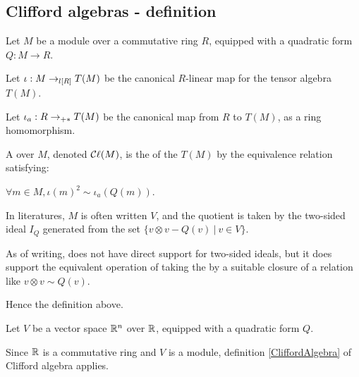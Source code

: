 \subsection{Clifford algebras - definition}
\label{sec:def}

\begin{definition}
    \label{CliffordAlgebra}
    \leanok

    Let $M$ be a module over a commutative ring $R$, equipped with a quadratic form $Q: M \to R$.

    Let $\iota : M \lmap{R} T(M)$ be the canonical $R$-linear map for the tensor algebra $T(M)$.

    Let $\iota_a : R \amap{R} T(M)$ be the canonical map from $R$ to $T(M)$, as a ring homomorphism.

    A  over $M$, denoted $\Cl (M)$, is
    the  of the  $T(M)$
    by the equivalence relation satisfying:

    $\forall m \in M, \iota(m)^2 \sim \iota_a(Q(m))$.
\end{definition}

\begin{remark}
  \label{mk:two_sided_ideals}
  
  In literatures, $M$ is often written $V$, and the quotient is taken by the two-sided ideal $I_Q$ generated from the set
  $\{ v \otimes v - Q(v) \:\vert\: v \in V \}$.

  As of writing, \Mathlib does not have direct support for two-sided ideals,
  but it does support the equivalent operation of taking the  by a suitable closure of
  a relation like $v \otimes v \sim Q(v)$.

  Hence the definition above.

\end{remark}

\begin{example}
  \label{ex:clifford_algebra_v}

  Let $V$ be a vector space $\RR^n$ over $\RR$, equipped with a quadratic form $Q$.
  
  Since $\RR$ is a commutative ring and $V$ is a module,
  definition \ref{CliffordAlgebra} of Clifford algebra applies.
\end{example}
